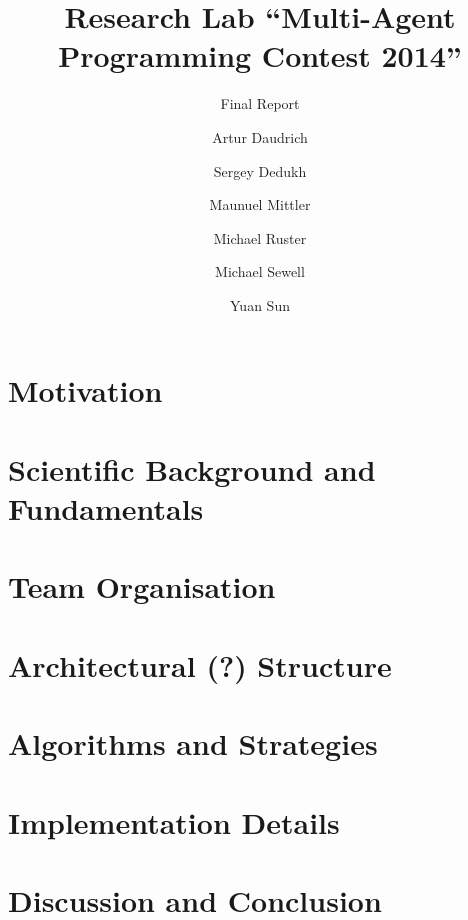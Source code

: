 \documentclass{../tech_reports/template/llncs}
\title{Research Lab \enquote{Multi-Agent Programming Contest 2014}}
\subtitle{Final Report}
\author{Artur Daudrich \and Sergey Dedukh \and Maunuel Mittler \and Michael Ruster \and Michael Sewell \and Yuan Sun}
\institute{University of Koblenz-Landau, Koblenz Campus}
\begin{document}
\maketitle

\tableofcontents

\section{Motivation}


\section{Scientific Background and Fundamentals}


\section{Team Organisation}


\section{Architectural (?) Structure}


\section{Algorithms and Strategies}


\section{Implementation Details}


\section{Discussion and Conclusion}



\clearpage

\end{document}
